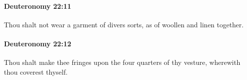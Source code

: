 		\paragraph{Deuteronomy 22:11} %
			\label{DEUTERONOMY-22-11}

			Thou shalt not wear a garment of divers sorts, as of woollen and linen together.


		\paragraph{Deuteronomy 22:12} %
			\label{DEUTERONOMY-22-12}

			Thou shalt make thee fringes upon the four quarters of thy vesture, wherewith thou coverest thyself.


